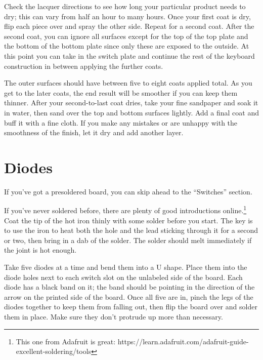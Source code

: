 \documentclass[landscape,twocolumn]{article}
\begin{document}
\vspace{1em}

Check the lacquer directions to see how long your particular product
needs to dry; this can vary from half an hour to many hours. Once your
first coat is dry, flip each piece over and spray the other
side. Repeat for a second coat. After the second coat, you can ignore
all surfaces except for the top of the top plate and the bottom of the
bottom plate since only these are exposed to the outside. At this
point you can take in the switch plate and continue the rest of the
keyboard construction in between applying the further coats.

\vspace{1em}

The outer surfaces should have between five to eight coats applied
total. As you get to the later coats, the end result will be smoother
if you can keep them thinner. After your second-to-last coat dries,
take your fine sandpaper and soak it in water, then sand over the top
and bottom surfaces lightly. Add a final coat and buff it with a fine
cloth. If you make any mistakes or are unhappy with the smoothness of
the finish, let it dry and add another layer.

\section{Diodes}

If you've got a presoldered board, you can skip ahead to the
``Switches'' section.

\vspace {1em}

If you've never soldered before, there are plenty of good
introductions online.\footnote{This one from Adafruit is great:
  https://learn.adafruit.com/adafruit-guide-excellent-soldering/tools}
Coat the tip of the hot iron thinly with some solder before you
start. The key is to use the iron to heat both the hole and the lead
sticking through it for a second or two, then bring in a dab of the
solder. The solder should melt immediately if the joint is hot enough.

\vspace{1em}

Take five diodes at a time and bend them into a U shape. Place them
into the diode holes next to each switch slot on the unlabeled side of
the board. Each diode has a black band on it; the band should be
pointing in the direction of the arrow on the printed side of
the board. Once all five are in, pinch the legs of the diodes together
to keep them from falling out, then flip the board over and solder
them in place. Make sure they don't protrude up more than necessary.
\end{document}
